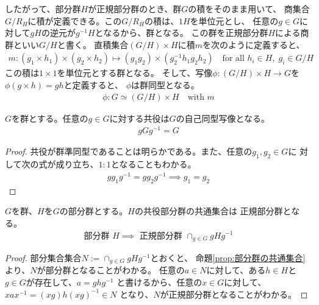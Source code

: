 {	したがって、部分群$H$が正規部分群のとき、群$G$の積をそのまま用いて、
	商集合$G/R_H$に積が定義できる。この$G/R_H$の積は、$1H$を単位元とし、
	任意の$g\in G$に対して$gH$の逆元が$g^{-1}H$となるから、群となる。
	この群を正規部分群$H$による商群といい$G/H$と書く。
	直積集合$(G/H)\times H$に積$m$を次のように定義すると、
	\begin{equation*}\begin{split}
		m: (g_1\times h_1)\times(g_2\times h_2) 
		\mapsto (g_1g_2)\times(g_2^{-1}h_1g_2h_2)
		\quad\text{for all }h_i\in H,\; g_i\in G/H
	\end{split}\end{equation*}
	この積は$1\times1$を単位元とする群となる。
	そして、写像$\phi:(G/H)\times H\to G$を$\phi(g\times h)=gh$と定義すると、
	$\phi$は群同型となる。
	\begin{equation*}\begin{split}
		\phi: G\simeq (G/H)\times H \quad\text{with } m
	\end{split}\end{equation*}

	\begin{proposition}[共役は自己同型]\label{prop:共役は自己同型} %
		$G$を群とする。任意の$g\in G$に対する共役は$G$の自己同型写像となる。
		\begin{equation*}\begin{split}
			gGg^{-1} = G
		\end{split}\end{equation*}
	\end{proposition} %
	\begin{proof} %
		共役が群準同型であることは明らかである。また、任意の$g_1,g_2\in G$に
		対して次の式が成り立ち、$1:1$となることもわかる。
		\begin{equation*}\begin{split}
			gg_1g^{-1} = gg_2g^{-1} \implies g_1 = g_2
		\end{split}\end{equation*}
	\end{proof} %

	\begin{proposition}[共役部分群の共通集合]\label{prop:共役部分群の共通集合} %
		$G$を群、$H$を$G$の部分群とする。$H$の共役部分群の共通集合は
		正規部分群となる。
		\begin{equation*}\begin{split}
			\text{部分群 } H \implies \text{ 正規部分群 } \cap_{g\in G} gHg^{-1}
		\end{split}\end{equation*}
	\end{proposition} %
	\begin{proof} %
		部分集合集合$N:=\cap_{g\in G} gHg^{-1}$とおくと、
		命題\ref{prop:部分群の共通集合}より、$N$が部分群となることがわかる。
		任意の$a\in N$に対して、ある$h\in H$と$g\in G$が存在して、$a=ghg^{-1}$
		と書けるから、任意の$x\in G$に対して、$xax^{-1}=(xg)h(xg)^{-1}\in N$
		となり、$N$が正規部分群となることがわかる。
	\end{proof} %
}
